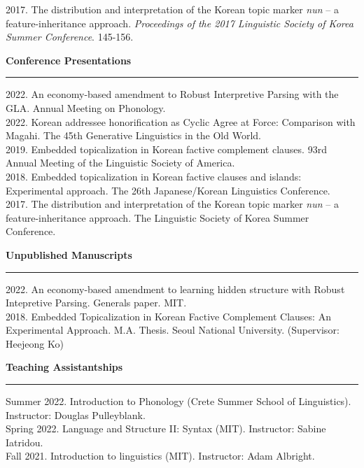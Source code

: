 \documentclass[12pt]{article}
\newcommand{\sect}[1]{{\fontsize{17}{30}\selectfont \textbf{#1}} {\vspace{0.1cm}} \hrule {\vspace{0.3cm}}}
\begin{document}
{2017. The distribution and interpretation of the Korean topic marker \textit{nun} -- a feature-inheritance approach. \textit{Proceedings of the 2017 Linguistic Society of Korea Summer Conference}. 145-156.

{\pagebreak}

\sect{Conference Presentations}

{2022. An economy-based amendment to Robust Interpretive Parsing with the GLA. Annual Meeting on Phonology.}\\

{2022. Korean addressee honorification as Cyclic Agree at Force: Comparison with Magahi. The 45th Generative Linguistics in the Old World.}\\

{2019. Embedded topicalization in Korean factive complement clauses. 93rd Annual Meeting of the Linguistic Society of America.}\\

{2018. Embedded topicalization in Korean factive clauses and islands: Experimental approach. The 26th Japanese/Korean Linguistics Conference.}\\

{2017. The distribution and interpretation of the Korean topic marker \textit{nun} -- a feature-inheritance approach. The Linguistic Society of Korea Summer Conference.}

{\vspace{1cm}}

\sect{Unpublished Manuscripts}

2022. An economy-based amendment to learning hidden structure with Robust Intepretive Parsing. Generals paper. MIT.\\

2018. Embedded Topicalization in Korean Factive Complement Clauses: An Experimental Approach. M.A. Thesis. Seoul National University. (Supervisor: Heejeong Ko)

{\vspace{1cm}}

\sect{Teaching Assistantships}

Summer 2022. Introduction to Phonology (Crete Summer School of Linguistics). Instructor: Douglas Pulleyblank.\\

Spring 2022. Language and Structure II: Syntax (MIT). Instructor: Sabine Iatridou.\\

Fall 2021. Introduction to linguistics (MIT). Instructor: Adam Albright.

}
\end{document}
